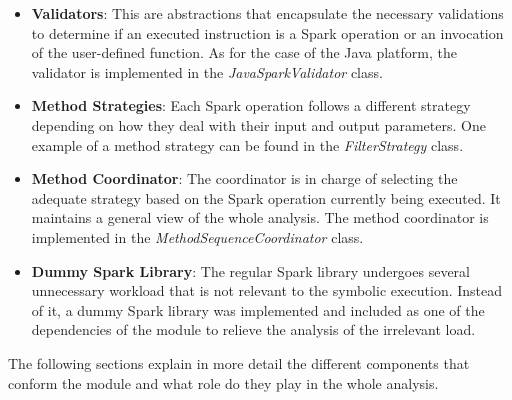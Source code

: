 \begin{itemize}
	\item \textbf{Validators}: This are abstractions that encapsulate the necessary validations to determine if an executed instruction is a Spark operation or an invocation of the user-defined function. As for the case of the Java platform, the validator is implemented in the \textit{JavaSparkValidator} class.
	\item \textbf{Method Strategies}: Each Spark operation follows a different strategy depending on how they deal with their input and output parameters. One example of a method strategy can be found in the \textit{FilterStrategy} class.
	\item \textbf{Method Coordinator}: The coordinator is in charge of selecting the adequate strategy based on the Spark operation currently being executed. It maintains a general view of the whole analysis. The method coordinator is implemented in the \textit{MethodSequenceCoordinator} class.
	\item \textbf{Dummy Spark Library}: The regular Spark library undergoes several unnecessary workload that is not relevant to the symbolic execution. Instead of it, a dummy Spark library was implemented and included as one of the dependencies of the module to relieve the analysis of the irrelevant load.
\end{itemize}

The following sections explain in more detail the different components that conform the module and what role do they play in the whole analysis.






